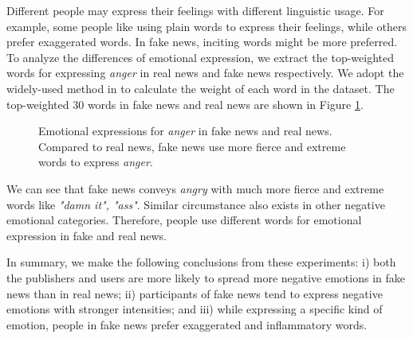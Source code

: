 \documentclass[conference]{IEEEtran}
\begin{document}
	Different people may express their feelings with different linguistic usage. For example, some people like using plain words to express their feelings, while others prefer exaggerated words. In fake news, inciting words might be more preferred. To analyze the differences of emotional expression, we extract the top-weighted words for expressing {\em anger} in real news and fake news respectively. We adopt the widely-used method in \cite{nlpcc14} to calculate the weight of each word in the dataset. 
	The top-weighted 30 words in fake news and real news are shown in Figure \ref{Fig:emotionalExpression}. 
	\begin{figure}[h]
		\centering
		
		\begin{minipage}[t]{0.24\textwidth}
		\end{minipage}
		\begin{minipage}[t]{0.24\textwidth}
		\end{minipage}
		
		\caption{Emotional expressions for \textit{anger} in fake news and real news. Compared to real news, fake news use more fierce and extreme words to express {\em anger}.}
		\label{Fig:emotionalExpression}
	\end{figure}
	
	We can see that fake news conveys \textit{angry} with much more fierce and extreme words like {\em "damn it", "ass"}. Similar circumstance also exists in other negative emotional categories. Therefore, people use different words for emotional expression in fake and real news.
	
	In summary, we make the following conclusions from these experiments: i) both the publishers and users are more likely to spread more negative emotions in fake news than in real news; ii) participants of fake news tend to express negative emotions with stronger intensities; and iii) while expressing a specific kind of emotion, people in fake news prefer exaggerated and inflammatory words. 
	
\end{document}

